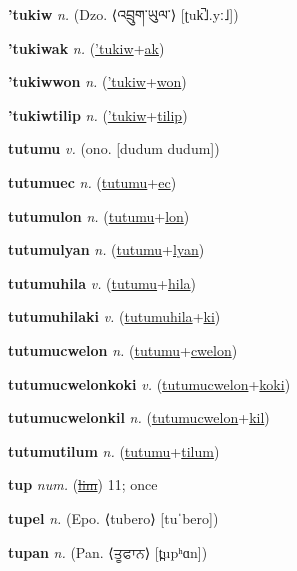\textbf{\hypertarget{'tukiw}{'tukiw}} \textit{n.} (Dzo. ⟨{\tibetan{}འབྲུག་ཡུལ་}⟩ [ʈuk̚˩.yː˩])


\textbf{\hypertarget{'tukiwak}{'tukiwak}} \textit{n.} (\hyperlink{'tukiw}{'tukiw}+\allowbreak \hyperlink{ak}{ak})


\textbf{\hypertarget{'tukiwwon}{'tukiwwon}} \textit{n.} (\hyperlink{'tukiw}{'tukiw}+\allowbreak \hyperlink{won}{won})


\textbf{\hypertarget{'tukiwtilip}{'tukiwtilip}} \textit{n.} (\hyperlink{'tukiw}{'tukiw}+\allowbreak \hyperlink{tilip}{tilip})


\textbf{\hypertarget{tutumu}{tutumu}} \textit{v.} (ono. [dudum dudum])


\textbf{\hypertarget{tutumuec}{tutumuec}} \textit{n.} (\hyperlink{tutumu}{tutumu}+\allowbreak \hyperlink{ec}{ec})


\textbf{\hypertarget{tutumulon}{tutumulon}} \textit{n.} (\hyperlink{tutumu}{tutumu}+\allowbreak \hyperlink{lon}{lon})


\textbf{\hypertarget{tutumulyan}{tutumulyan}} \textit{n.} (\hyperlink{tutumu}{tutumu}+\allowbreak \hyperlink{lyan}{lyan})


\textbf{\hypertarget{tutumuhila}{tutumuhila}} \textit{v.} (\hyperlink{tutumu}{tutumu}+\allowbreak \hyperlink{hila}{hila})


\textbf{\hypertarget{tutumuhilaki}{tutumuhilaki}} \textit{v.} (\hyperlink{tutumuhila}{tutumuhila}+\allowbreak \hyperlink{ki}{ki})


\textbf{\hypertarget{tutumucwelon}{tutumucwelon}} \textit{n.} (\hyperlink{tutumu}{tutumu}+\allowbreak \hyperlink{cwelon}{cwelon})


\textbf{\hypertarget{tutumucwelonkoki}{tutumucwelonkoki}} \textit{v.} (\hyperlink{tutumucwelon}{tutumucwelon}+\allowbreak \hyperlink{koki}{koki})


\textbf{\hypertarget{tutumucwelonkil}{tutumucwelonkil}} \textit{n.} (\hyperlink{tutumucwelon}{tutumucwelon}+\allowbreak \hyperlink{kil}{kil})


\textbf{\hypertarget{tutumutilum}{tutumutilum}} \textit{n.} (\hyperlink{tutumu}{tutumu}+\allowbreak \hyperlink{tilum}{tilum})


\textbf{\hypertarget{tup}{tup}} \textit{num.} (\hyperlink{lim}{\sout{lim}})
11; once

\textbf{\hypertarget{tupel}{tupel}} \textit{n.} (Epo. ⟨tubero⟩ [tuˈbero])


\textbf{\hypertarget{tupan}{tupan}} \textit{n.} (Pan. ⟨{\gurmukhi{}ਤੂਫਾਨ}⟩ [t̪upʰɑn])


